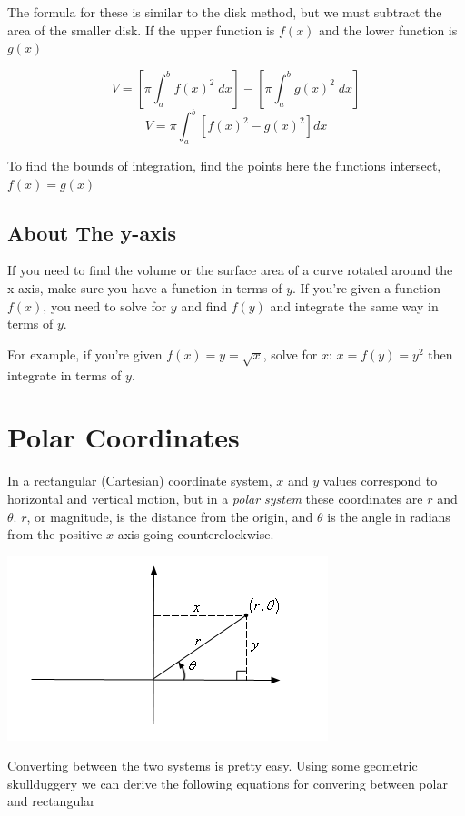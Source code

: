 \documentclass[12pt]{report}
\begin{document}
The formula for these is similar to the disk method, but we must subtract the area of the smaller disk. If the upper function is $f(x)$ and the lower function is $g(x)$

$$ V = \left[ \pi \int_a^b f(x)^2 \; dx \right] - \left[ \pi \int_a^b g(x)^2 \; dx \right] $$
$$ V = \pi \int_a^b \left[ f(x)^2 - g(x)^2 \right] dx $$

To find the bounds of integration, find the points here the functions intersect, $f(x) = g(x)$


\subsection*{About The y-axis}
If you need to find the volume or the surface area of a curve rotated around the x-axis, make sure you have a function in terms of $y$. If you're given a function $f(x)$, you need to solve for $y$ and find $f(y)$ and integrate the same way in terms of $y$.

For example, if you're given $f(x) = y = \sqrt{x} $, solve for $x$: $x = f(y) = y^2$ then integrate in terms of $y$.




\section{Polar Coordinates}
In a rectangular (Cartesian) coordinate system, $x$ and $y$ values correspond to horizontal and vertical motion, but in a \textit{polar system} these coordinates are $r$ and $\theta$. $r$, or magnitude, is the distance from the origin, and $\theta$ is the angle in radians from the positive $x$ axis going counterclockwise.

\begin{center}
\includegraphics[scale=0.9]{polar_coords}
\end{center}

Converting between the two systems is pretty easy. Using some geometric skullduggery we can derive the following equations for convering between polar and rectangular
\end{document}
